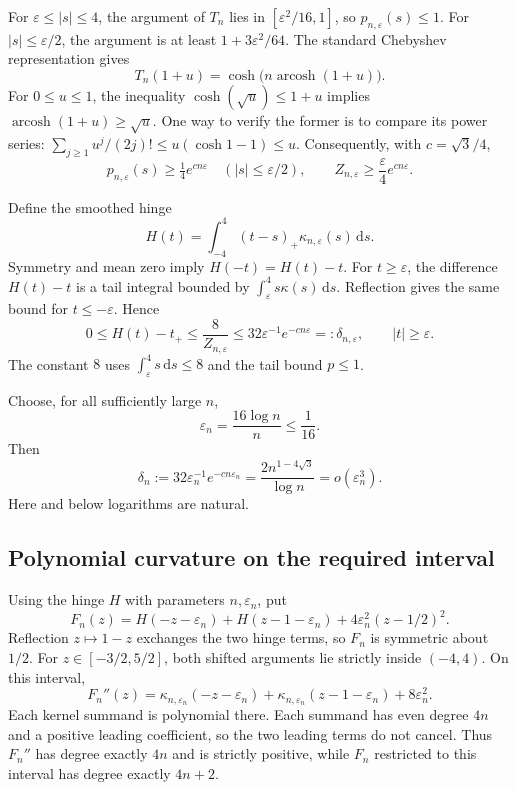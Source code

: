 \documentclass[11pt]{article}
\theoremstyle{definition}\newtheorem{definition}[theorem]{Definition}
\theoremstyle{remark}\newtheorem{remark}[theorem]{Remark}
\newcommand{\rd}{\,\mathrm d}
\begin{document}
For $\varepsilon\le|s|\le4$, the argument of $T_n$ lies in $[\varepsilon^2/16,1]$, so $p_{n,\varepsilon}(s)\le1$. For $|s|\le\varepsilon/2$, the argument is at least $1+3\varepsilon^2/64$. The standard Chebyshev representation \cite[Eq.~18.5.1]{dlmf} gives
\[
T_n(1+u)=\cosh\bigl(n\operatorname{arcosh}(1+u)\bigr).
\]
For $0\le u\le1$, the inequality $\cosh(\sqrt u)\le1+u$ implies $\operatorname{arcosh}(1+u)\ge\sqrt u$. One way to verify the former is to compare its power series:
$\sum_{j\ge1}u^j/(2j)!\le u(\cosh1-1)\le u$.
Consequently, with $c=\sqrt3/4$,
\begin{equation}
p_{n,\varepsilon}(s)\ge\tfrac14e^{cn\varepsilon}
\quad(|s|\le\varepsilon/2),\qquad
Z_{n,\varepsilon}\ge\frac\varepsilon4e^{cn\varepsilon}.
\label{eq:normalizer}
\end{equation}

Define the smoothed hinge
\[
H(t)=\int_{-4}^4(t-s)_+\kappa_{n,\varepsilon}(s)\rd s.
\]
Symmetry and mean zero imply $H(-t)=H(t)-t$. For $t\ge\varepsilon$, the difference $H(t)-t$ is a tail integral bounded by $\int_\varepsilon^4s\kappa(s)\rd s$. Reflection gives the same bound for $t\le-\varepsilon$. Hence
\begin{equation}
0\le H(t)-t_+\le\frac8{Z_{n,\varepsilon}}
\le32\varepsilon^{-1}e^{-cn\varepsilon}=:\delta_{n,\varepsilon},
\qquad |t|\ge\varepsilon.
\label{eq:hingeerror}
\end{equation}
The constant $8$ uses $\int_\varepsilon^4s\rd s\le8$ and the tail bound $p\le1$.

Choose, for all sufficiently large $n$,
\begin{equation}
\varepsilon_n=\frac{16\log n}{n}\le\frac1{16}.
\label{eq:epsilon}
\end{equation}
Then
\begin{equation}
\delta_n:=32\varepsilon_n^{-1}e^{-cn\varepsilon_n}
=\frac{2n^{1-4\sqrt3}}{\log n}=o(\varepsilon_n^3).
\label{eq:deltarate}
\end{equation}
Here and below logarithms are natural.

\subsection{Polynomial curvature on the required interval}
Using the hinge $H$ with parameters $n,\varepsilon_n$, put
\begin{equation}
F_n(z)=H(-z-\varepsilon_n)+H(z-1-\varepsilon_n)
       +4\varepsilon_n^2(z-1/2)^2.
\label{eq:Fn}
\end{equation}
Reflection $z\mapsto1-z$ exchanges the two hinge terms, so $F_n$ is symmetric about $1/2$. For $z\in[-3/2,5/2]$, both shifted arguments lie strictly inside $(-4,4)$. On this interval,
\begin{equation}
F_n''(z)=\kappa_{n,\varepsilon_n}(-z-\varepsilon_n)
+\kappa_{n,\varepsilon_n}(z-1-\varepsilon_n)+8\varepsilon_n^2.
\label{eq:Fncurvature}
\end{equation}
Each kernel summand is polynomial there. Each summand has even degree $4n$ and a positive leading coefficient, so the two leading terms do not cancel. Thus $F_n''$ has degree exactly $4n$ and is strictly positive, while $F_n$ restricted to this interval has degree exactly $4n+2$.
\end{document}
